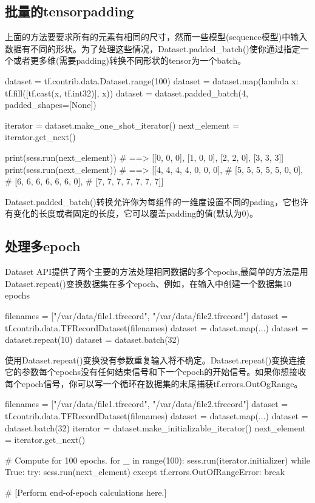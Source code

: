 \subsection{批量的tensorpadding}
上面的方法要要求所有的元素有相同的尺寸，然而一些模型(sequence模型)中输入数据有不同的形状。为了处理这些情况，Dataset.padded\_batch()使你通过指定一个或者更多维(需要padding)转换不同形状的tensor为一个batch。
\begin{python}
dataset = tf.contrib.data.Dataset.range(100)
dataset = dataset.map(lambda x: tf.fill([tf.cast(x, tf.int32)], x))
dataset = dataset.padded_batch(4, padded_shapes=[None])

iterator = dataset.make_one_shot_iterator()
next_element = iterator.get_next()

print(sess.run(next_element))  # ==> [[0, 0, 0], [1, 0, 0], [2, 2, 0], [3, 3, 3]]
print(sess.run(next_element))  # ==> [[4, 4, 4, 4, 0, 0, 0],
                               #      [5, 5, 5, 5, 5, 0, 0],
                               #      [6, 6, 6, 6, 6, 6, 0],
                               #      [7, 7, 7, 7, 7, 7, 7]]
\end{python}
Dataset.padded\_batch()转换允许你为每组件的一维度设置不同的pading，它也许有变化的长度或者固定的长度，它可以覆盖padding的值(默认为0)。
\subsection{处理多epoch}
Dataset API提供了两个主要的方法处理相同数据的多个epochs,最简单的方法是用Dataset.repeat()变换数据集在多个epoch、例如，在输入中创建一个数据集10 epochs
\begin{python}
filenames = ["/var/data/file1.tfrecord", "/var/data/file2.tfrecord"]
dataset = tf.contrib.data.TFRecordDataset(filenames)
dataset = dataset.map(...)
dataset = dataset.repeat(10)
dataset = dataset.batch(32)
\end{python}
使用Dataset.repeat()变换没有参数重复输入将不确定。Dataset.repeat()变换连接它的参数每个epochs没有任何结束信号和下一个epoch的开始信号。如果你想接收每个epoch信号，你可以写一个循环在数据集的末尾捕获tf.errors.OutOgRange。
\begin{python}
filenames = ["/var/data/file1.tfrecord", "/var/data/file2.tfrecord"]
dataset = tf.contrib.data.TFRecordDataset(filenames)
dataset = dataset.map(...)
dataset = dataset.batch(32)
iterator = dataset.make_initializable_iterator()
next_element = iterator.get_next()

# Compute for 100 epochs.
for _ in range(100):
    sess.run(iterator.initializer)
    while True:
    try:
        sess.run(next_element)
    except tf.errors.OutOfRangeError:
        break

  # [Perform end-of-epoch calculations here.]
\end{python}

